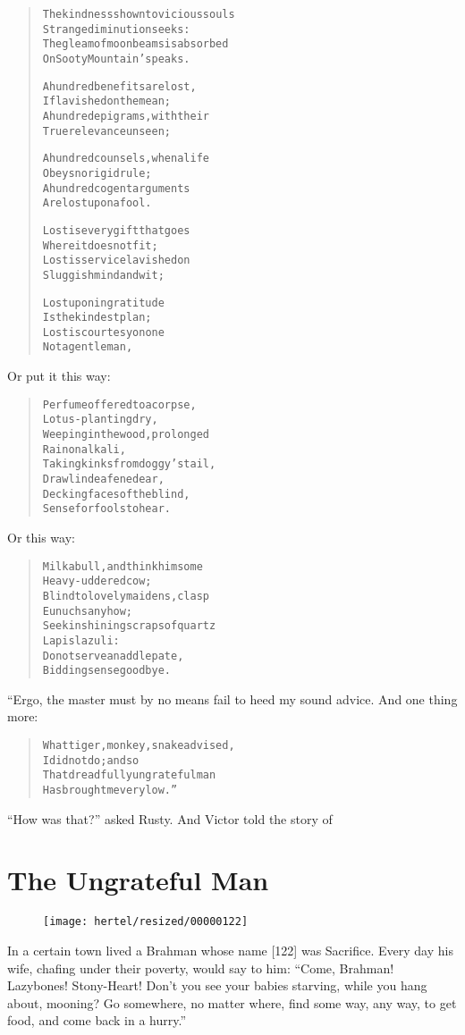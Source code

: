 \documentclass[article, twoside, 10pt]{memoir}
\renewenvironment{verbatim}{%
\begin{quote}%
\vskip -10pt%
\begin{alltt}\normalfont\small}{\end{alltt}%
\end{quote}%
\vskip -10pt
} %
\begin{document}
\begin{verbatim}
The kindness shown to vicious souls
    Strange diminution seeks:
The gleam of moonbeams is absorbed
    On Sooty Mountain's peaks.

A hundred benefits are lost,
    If lavished on the mean;
A hundred epigrams, with their
    True relevance unseen;

A hundred counsels, when a life
    Obeys no rigid rule;
A hundred cogent arguments
    Are lost upon a fool.

Lost is every gift that goes
    Where it does not fit;
Lost is service lavished on
    Sluggish mind and wit;

Lost upon ingratitude
    Is the kindest plan;
Lost is courtesy on one
    Not a gentleman,
\end{verbatim}
Or put it this way:

\begin{verbatim}
Perfume offered to a corpse,
    Lotus-planting dry,
Weeping in the wood, prolonged
    Rain on alkali,
Taking kinks from doggy's tail,
    Drawl in deafened ear,
Decking faces of the blind,
    Sense for fools to hear.
\end{verbatim}
Or this way:

\begin{verbatim}
Milk a bull, and think him some
    Heavy-uddered cow;
Blind to lovely maidens, clasp
    Eunuchs anyhow;
Seek in shining scraps of quartz
    Lapis lazuli:
Do not serve an addlepate,
    Bidding sense goodbye.
\end{verbatim}
“Ergo, the master must by no means fail to heed my sound advice.
And one thing more:

\begin{verbatim}
What tiger, monkey, snake advised,
    I did not do; and so
That dreadfully ungrateful man
    Has brought me very low.”
\end{verbatim}
``How was that?'' asked Rusty. And Victor told the story of

\chapter{The Ungrateful Man}

\begin{figure}[p]\texttt{[image: hertel/resized/00000122]}\end{figure}In a certain town lived a Brahman whose name [122] was Sacrifice.
Every day his wife, chafing under their poverty, would say to him:
``Come, Brahman! Lazybones! Stony-Heart! Don't you see your babies starving, while you hang about, mooning? Go somewhere, no matter where, find some way, any way, to get food, and come back in a hurry.''
\end{document}
